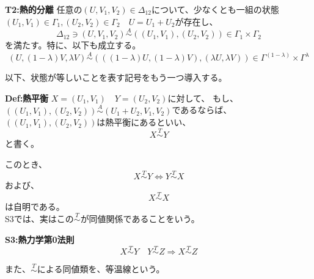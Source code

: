 \documentclass[a4paper,11pt]{jsarticle}
\begin{document}
\begin{itembox}[l]{\textbf{T2:熱的分離}}
任意の$(U,V_1,V_2) \in \Delta_{12}$について、少なくとも一組の状態$(U_1,V_1)\in \Gamma_1,(U_2,V_2) \in \Gamma_2\quad U=U_1+U_2$が存在し、
\begin{equation}
    \Delta_{12} \ni (U,V_1,V_2) \overset{A}{\sim}((U_1,V_1),(U_2,V_2))\in \Gamma_1 \times \Gamma_2
\end{equation}
を満たす。特に、以下も成立する。
\begin{equation}
    (U,(1-\lambda)V,\lambda V) \overset{A}{\sim}(((1-\lambda)U,(1-\lambda)V),(\lambda U,\lambda V)) \in \Gamma^{(1-\lambda)} \times \Gamma^{\lambda}
\end{equation}
\end{itembox}
以下、状態が等しいことを表す記号をもう一つ導入する。\\
\begin{itembox}[l]{\textbf{Def:熱平衡}}
$X=(U_1,V_1) \quad Y =(U_2,V_2)$に対して、
もし、$((U_1,V_1),(U_2,V_2)) \overset{A}{\sim} (U_1+U_2,V_1,V_2)$であるならば、$((U_1,V_1),(U_2,V_2))$は熱平衡にあるといい、
\begin{equation}
    X \overset{T}{\sim} Y
\end{equation}
と書く。
\end{itembox}
このとき、
\begin{equation}
    X \overset{T}{\sim} Y \Leftrightarrow Y \overset{T}{\sim} X
\end{equation}
および、
\begin{equation}
    X \overset{T}{\sim} X
\end{equation}
は自明である。\\
S3では、実はこの$\overset{T}{\sim}$が同値関係であることをいう。\\

\begin{itembox}[l]{\textbf{S3:熱力学第0法則}}
    \begin{equation}
        X \overset{T}{\sim} Y \quad Y \overset{T}{\sim} Z \Rightarrow X \overset{T}{\sim} Z
    \end{equation}
\end{itembox}
また、$\overset{T}{\sim}$による同値類を、等温線という。\\
\end{document}
